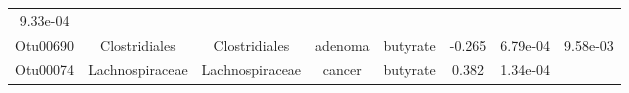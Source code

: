 \documentclass[11pt,]{article}
\begin{document}
\begin{longtable}[]{@{}cccccccc@{}}
\begin{minipage}[t]{0.08\columnwidth}
9.33e-04\strut
\end{minipage}\tabularnewline
\begin{minipage}[t]{0.08\columnwidth}\centering\strut
Otu00690\strut
\end{minipage} & \begin{minipage}[t]{0.15\columnwidth}\centering\strut
Clostridiales\strut
\end{minipage} & \begin{minipage}[t]{0.15\columnwidth}\centering\strut
Clostridiales\strut
\end{minipage} & \begin{minipage}[t]{0.08\columnwidth}\centering\strut
adenoma\strut
\end{minipage} & \begin{minipage}[t]{0.09\columnwidth}\centering\strut
butyrate\strut
\end{minipage} & \begin{minipage}[t]{0.07\columnwidth}\centering\strut
-0.265\strut
\end{minipage} & \begin{minipage}[t]{0.08\columnwidth}\centering\strut
6.79e-04\strut
\end{minipage} & \begin{minipage}[t]{0.08\columnwidth}\centering\strut
9.58e-03\strut
\end{minipage}\tabularnewline
\begin{minipage}[t]{0.08\columnwidth}\centering\strut
Otu00074\strut
\end{minipage} & \begin{minipage}[t]{0.15\columnwidth}\centering\strut
Lachnospiraceae\strut
\end{minipage} & \begin{minipage}[t]{0.15\columnwidth}\centering\strut
Lachnospiraceae\strut
\end{minipage} & \begin{minipage}[t]{0.08\columnwidth}\centering\strut
cancer\strut
\end{minipage} & \begin{minipage}[t]{0.09\columnwidth}\centering\strut
butyrate\strut
\end{minipage} & \begin{minipage}[t]{0.07\columnwidth}\centering\strut
0.382\strut
\end{minipage} & \begin{minipage}[t]{0.08\columnwidth}\centering\strut
1.34e-04\strut
\end{minipage} & \begin{minipage}[t]{0.08\columnwidth}\centering\strut

\end{minipage}
\end{longtable}
\end{document}
